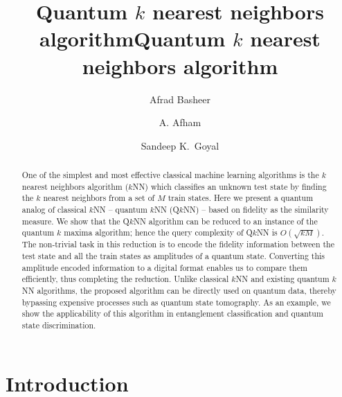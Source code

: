 \documentclass[a4paper,twocolumn,11pt,unpublished]{quantumarticle}
\begin{document}
\title{Quantum $k$ nearest neighbors algorithm}

\title{Quantum $k$ nearest neighbors algorithm}
\author{Afrad Basheer}
\author{A. Afham}
\author{Sandeep K.~Goyal}


\maketitle

\begin{abstract}
  One of the simplest and most effective classical machine learning algorithms is the $k$ nearest neighbors algorithm ($k$NN) which classifies an unknown test state by finding the $k$ nearest neighbors from a set of $M$ train states. Here we present a quantum analog of classical $k$NN -- quantum $k$NN (Q$k$NN) -- based on fidelity as the similarity measure. We show that the Q$k$NN algorithm can be reduced to an instance of the quantum $k$ maxima algorithm; hence the query complexity of Q$k$NN is $O(\sqrt{kM})$. The non-trivial task in this reduction is to encode the fidelity information between the test state and all the train states as amplitudes of a quantum state. Converting this amplitude encoded information to a digital format enables us to compare them efficiently, thus completing the reduction. Unlike classical $k$NN and existing quantum $k$NN algorithms, the proposed algorithm can be directly used on quantum data, thereby bypassing expensive processes such as quantum state tomography. As an example, we show the applicability of this algorithm in entanglement classification and quantum state discrimination.
\end{abstract}




\section{Introduction} \label{Sec:Introduction} 
\end{document}
